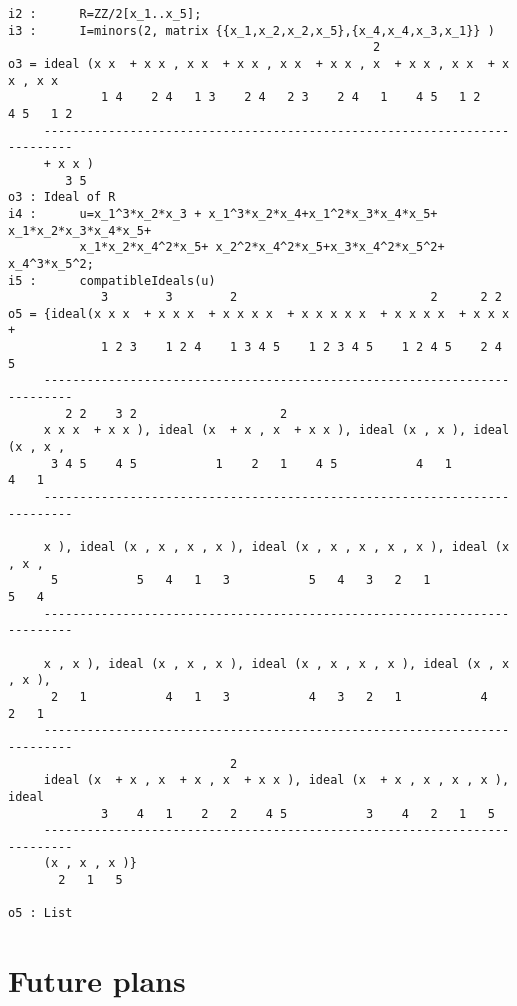 \documentclass[11pt]{amsart}
\begin{document}
\begin{verbatim}
i2 :      R=ZZ/2[x_1..x_5];
i3 :      I=minors(2, matrix {{x_1,x_2,x_2,x_5},{x_4,x_4,x_3,x_1}} )
                                                   2
o3 = ideal (x x  + x x , x x  + x x , x x  + x x , x  + x x , x x  + x x , x x
             1 4    2 4   1 3    2 4   2 3    2 4   1    4 5   1 2    4 5   1 2
     --------------------------------------------------------------------------
     + x x )
        3 5
o3 : Ideal of R
i4 :      u=x_1^3*x_2*x_3 + x_1^3*x_2*x_4+x_1^2*x_3*x_4*x_5+ x_1*x_2*x_3*x_4*x_5+
          x_1*x_2*x_4^2*x_5+ x_2^2*x_4^2*x_5+x_3*x_4^2*x_5^2+ x_4^3*x_5^2;
i5 :      compatibleIdeals(u)
             3        3        2                           2      2 2
o5 = {ideal(x x x  + x x x  + x x x x  + x x x x x  + x x x x  + x x x  +
             1 2 3    1 2 4    1 3 4 5    1 2 3 4 5    1 2 4 5    2 4 5
     --------------------------------------------------------------------------
        2 2    3 2                    2
     x x x  + x x ), ideal (x  + x , x  + x x ), ideal (x , x ), ideal (x , x ,
      3 4 5    4 5           1    2   1    4 5           4   1           4   1
     --------------------------------------------------------------------------

     x ), ideal (x , x , x , x ), ideal (x , x , x , x , x ), ideal (x , x ,
      5           5   4   1   3           5   4   3   2   1           5   4
     --------------------------------------------------------------------------

     x , x ), ideal (x , x , x ), ideal (x , x , x , x ), ideal (x , x , x ),
      2   1           4   1   3           4   3   2   1           4   2   1
     --------------------------------------------------------------------------
                               2
     ideal (x  + x , x  + x , x  + x x ), ideal (x  + x , x , x , x ), ideal
             3    4   1    2   2    4 5           3    4   2   1   5
     --------------------------------------------------------------------------
     (x , x , x )}
       2   1   5

o5 : List
\end{verbatim}

\section{Future plans}



\end{document}
